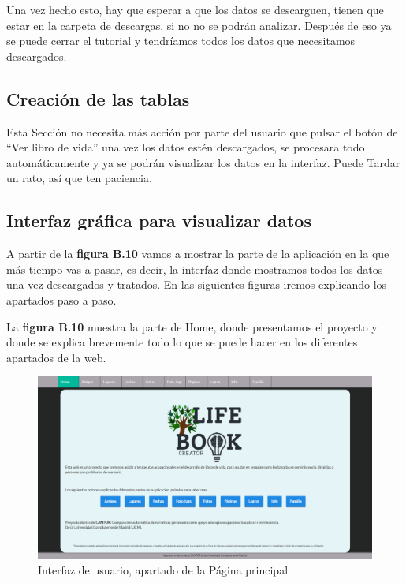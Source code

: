 Una vez hecho esto, hay que esperar a que los datos se descarguen, tienen que estar en la carpeta de descargas, si no no se podrán analizar. Después de eso ya se puede cerrar el tutorial y tendríamos todos los datos que necesitamos descargados.

\subsection{Creación de las tablas}

Esta Sección no necesita más acción por parte del usuario que pulsar el botón de ``Ver libro de vida'' una vez los datos estén descargados, se procesara todo automáticamente y ya se podrán visualizar los datos en la interfaz. Puede Tardar un rato, así que ten paciencia.

\subsection{Interfaz gráfica para visualizar datos}

A partir de la \textbf{figura B.10} vamos a mostrar la parte de la aplicación en la que más tiempo vas a pasar, es decir, la interfaz donde mostramos todos los datos una vez descargados y tratados. En las siguientes figuras iremos explicando los apartados paso a paso.


La \textbf{figura B.10} muestra la parte de Home, donde presentamos el proyecto y donde se explica brevemente todo lo que se puede hacer en los diferentes apartados de la web.
\begin{figure}
	\begin{center}
		\includegraphics[scale=0.3]{Imagenes/Fuentes/InterfazHome.png} \caption{Interfaz de usuario, apartado de la Página principal}
		\label{WebAplication1}
	\end{center}
\end{figure}


